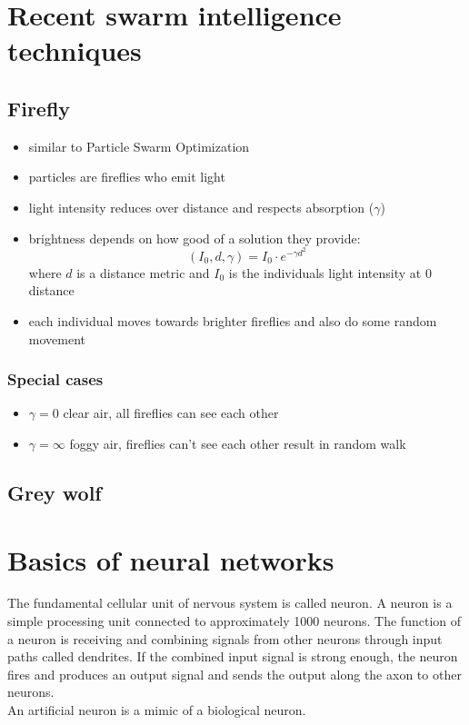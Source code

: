 \documentclass[a4paper,12pt,answers]{article}
\begin{document}
	
	
	\newpage
	\section{Recent swarm intelligence techniques}
	\subsection{Firefly}
	\begin{itemize}
		\item similar to Particle Swarm Optimization
		\item particles are fireflies who emit light
		\item light intensity reduces over distance and respects absorption ($\gamma$)
		\item brightness depends on how good of a solution they provide:
			\[
				(I_0, d, \gamma) = I_0 \cdot e^{-\gamma d^2}
			\]
			where $d$ is a distance metric and $I_0$ is the individuals light intensity at 0 distance
		\item each individual moves towards brighter fireflies and also do some random movement
	\end{itemize}
	
	\subsubsection{Special cases}
	\begin{itemize}
		\item $\gamma = 0$ clear air, all fireflies can see each other
		\item $\gamma = \infty $ foggy air, fireflies can't see each other result in random walk
	\end{itemize}
	
	\subsection{Grey wolf}
	\href{https://en.wikiversity.org/wiki/Algorithm_models/Grey_Wolf_Optimizer}{\color{blue}{GWO algorithm}}
	
	

	
	\newpage
	\section{Basics of neural networks}
	The fundamental cellular unit of nervous system is called neuron. A neuron is a simple processing unit connected to approximately 1000 neurons. The function of a neuron is receiving and combining signals from other neurons through input paths called dendrites. If the combined input signal is strong enough, the neuron fires and produces an output signal and sends the output along the axon to other neurons.
	\\[8pt]
	\noindent
	An artificial neuron is a mimic of a biological neuron.
	
\end{document}

